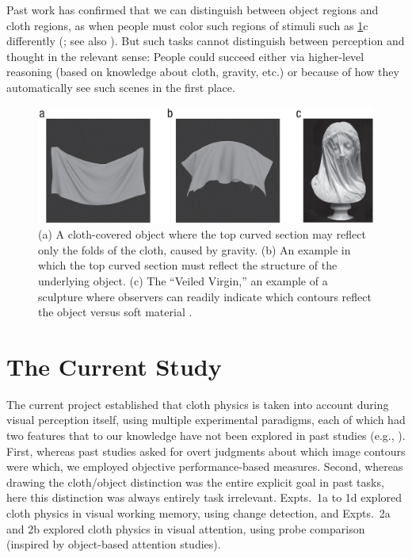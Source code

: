 Past work has confirmed that we can distinguish between object regions and cloth regions, as when people must color such regions of stimuli such as \cref{fig:PsychSci2023_1}c differently (\cite{phillips_veiled_2020}; see also \cite{yildirim_perceiving_2016}). But such tasks cannot distinguish between perception and thought in the relevant sense: People could succeed either via higher-level reasoning (based on knowledge about cloth, gravity, etc.) or because of how they automatically see such scenes in the first place.

\begin{figure}
    \centering
    \includegraphics[width=\textwidth]{figures/PsychSci2023/fig1_cloth_statues.jpeg}
    \caption
    {(a) A cloth-covered object where the top curved section may reflect only the folds of the cloth, caused by gravity. (b) An example in which the top curved section must reflect the structure of the underlying object. (c) The “Veiled Virgin,” an example of a sculpture where observers can readily indicate which contours reflect the object versus soft material .}
    \label{fig:PsychSci2023_1}
\end{figure}

\section{The Current Study}

The current project established that cloth physics is taken into account during visual perception itself, using multiple experimental paradigms, each of which had two features that to our knowledge have not been explored in past studies (e.g., \cite{phillips_veiled_2020, ullman_draping_2019, yildirim_perceiving_2016}). First, whereas past studies asked for overt judgments about which image contours were which, we employed objective performance-based measures. Second, whereas drawing the cloth/object distinction was the entire explicit goal in past tasks, here this distinction was always entirely task irrelevant. Expts.~1a to 1d explored cloth physics in visual working memory, using change detection, and Expts.~2a and 2b explored cloth physics in visual attention, using probe comparison (inspired by object-based attention studies).

